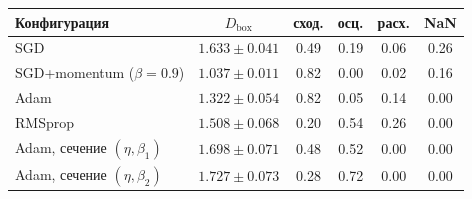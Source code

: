 \begin{tabular}{lccccc}
\toprule
Конфигурация & $D_{\mathrm{box}}$ & сход. & осц. & расх. & NaN\\
\midrule
SGD & $1.633 \pm 0.041$ & 0.49 & 0.19 & 0.06 & 0.26\\
SGD+momentum ($\beta=0.9$) & $1.037 \pm 0.011$ & 0.82 & 0.00 & 0.02 & 0.16\\
Adam & $1.322 \pm 0.054$ & 0.82 & 0.05 & 0.14 & 0.00\\
RMSprop & $1.508 \pm 0.068$ & 0.20 & 0.54 & 0.26 & 0.00\\
Adam, сечение $(\eta,\beta_1)$ & $1.698 \pm 0.071$ & 0.48 & 0.52 & 0.00 & 0.00\\
Adam, сечение $(\eta,\beta_2)$ & $1.727 \pm 0.073$ & 0.28 & 0.72 & 0.00 & 0.00\\
\bottomrule
\end{tabular}
